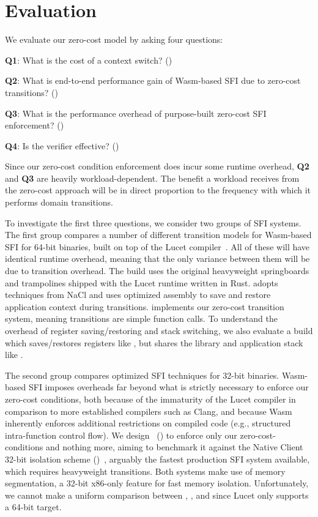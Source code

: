 \section{Evaluation}
\label{sec:eval}
We evaluate our zero-cost model by asking four questions:
\begin{CompactItemize}
\item \textbf{Q1}: What is the cost of a context switch? ()
\item \textbf{Q2}: What is end-to-end performance gain of Wasm-based SFI due to zero-cost transitions? ()
\item \textbf{Q3}: What is the performance overhead of purpose-built zero-cost SFI enforcement? ()
\item \textbf{Q4}: Is the \verifname verifier effective? ()
\end{CompactItemize}

Since our zero-cost condition enforcement does incur some runtime overhead, \textbf{Q2} and \textbf{Q3} are heavily workload-dependent.
%
The benefit a workload receives from the zero-cost approach will be in direct proportion to the frequency with which it performs domain transitions.


To investigate the first three questions, we consider two groups of SFI systems.
%
The first group compares a number of different transition models for Wasm-based SFI for 64-bit binaries, built on top of the Lucet compiler~\cite{lucet}.
%
All of these will have identical runtime overhead, meaning that the only variance between them will be due to transition overhead.
%
The \trlucet build uses the original heavyweight springboards and trampolines
shipped with the Lucet runtime written in Rust.
%
\trfullswitch adopts techniques from NaCl and uses optimized
assembly to save and restore application context during transitions.
%
\trfast implements our zero-cost transition system, meaning transitions are
simple function calls.
%
To understand the overhead of register saving/restoring and stack
switching, we also evaluate a \trregsave build which saves/restores registers
like \trfullswitch, but shares the library and application stack like
\trfast.

The second group compares optimized SFI techniques for 32-bit binaries.
%
Wasm-based SFI imposes overheads far beyond what is strictly necessary to
enforce our zero-cost conditions, both because of the immaturity of the Lucet
compiler in comparison to more established compilers such as Clang, and because
Wasm inherently enforces additional restrictions on compiled code (e.g.,
structured intra-function control flow).
%
We design \trsegmentsfi~() to enforce only our zero-cost-conditions and nothing more, aiming to benchmark it against the Native Client 32-bit isolation scheme (\trnacl)~\cite{yee_native_2009}, arguably the fastest production SFI system available, which requires heavyweight transitions.
%
Both systems make use of memory segmentation, a 32-bit x86-only feature for fast memory isolation.
%
Unfortunately, we cannot make a uniform comparison between \trnacl, \trsegmentsfi, and \trfast since Lucet only supports a 64-bit target.

